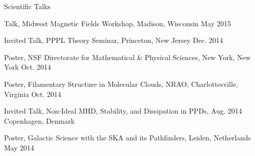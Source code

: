 \documentclass{resume_clark} %
\begin{document}
\begin{rSection}{Scientific Talks}
\begin{etaremune}
\item Talk, Midwest Magnetic Fields Workshop, Madison, Wisconsin \hfill {May 2015}

\item Invited Talk, PPPL Theory Seminar, Princeton, New Jersey \hfill {Dec. 2014}

\item Poster, NSF Directorate for Mathematical \& Physical Sciences, New York, New York \hfill {Oct. 2014}

\item Poster, Filamentary Structure in Molecular Clouds, NRAO, Charlottesville, Virginia \hfill {Oct. 2014}

\item Invited Talk, Non-Ideal MHD, Stability, and Dissipation in PPDs, \hfill {Aug. 2014} \\ Copenhagen, Denmark 

\item Poster, Galactic Science with the SKA and its Pathfinders, Leiden, Netherlands \hfill {May 2014}


\end{etaremune}
\end{rSection}
\end{document}
